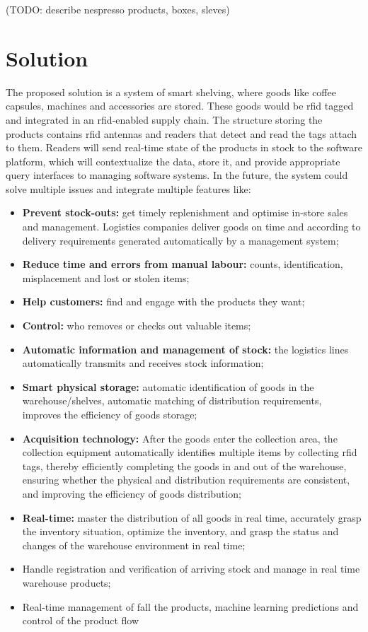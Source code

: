 (TODO: describe nespresso products, boxes, sleves)

\section{Solution}

The proposed solution is a system of smart shelving, where goods like coffee capsules, machines and accessories are stored. These goods would be \ac{rfid} tagged and integrated in an \ac{rfid}-enabled supply chain.
The structure storing the products contains \ac{rfid} antennas and readers that detect and read the tags attach to them. Readers will send real-time state of the products in stock to the software platform, which will contextualize the data, store it, and provide appropriate query interfaces to managing software systems.
In the future, the system could solve multiple issues and integrate multiple features like:

\begin{itemize}
    \item \textbf{Prevent stock-outs:} get timely replenishment and optimise in-store sales and management. Logistics companies deliver goods on time and according to delivery requirements generated automatically by a management system;
    \item \textbf{Reduce time and errors from manual labour:} counts, identification, misplacement and lost or stolen items;
    \item \textbf{Help customers:} find and engage with the products they want;
    \item \textbf{Control:} who removes or checks out valuable items;
    \item \textbf{Automatic information and management of stock:} the logistics lines automatically  transmits and receives stock information;
    \item \textbf{Smart physical storage:} automatic identification of goods in the warehouse/shelves, automatic matching of distribution requirements, improves the efficiency of goods storage;
    \item \textbf{Acquisition technology:} After the goods enter the collection area, the collection equipment automatically identifies multiple items by collecting \ac{rfid} tags, thereby efficiently completing the goods in and out of the warehouse, ensuring whether the physical and  distribution  requirements are consistent, and improving the efficiency of goods distribution;
    \item \textbf{Real-time:} master the distribution of all goods in real time, accurately grasp the inventory situation, optimize the inventory, and grasp the status and changes of the warehouse environment in real time;
    \item Handle registration and verification of arriving stock and manage in real time warehouse products;
    \item Real-time  management  of fall the  products, machine learning predictions and control of the product flow
\end{itemize}

